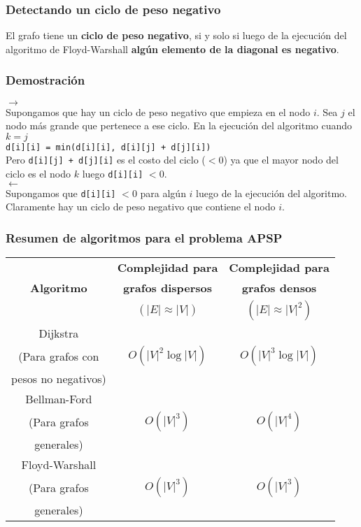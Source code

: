 \documentclass{beamer}
\begin{document}
	\begin{frame}
		\frametitle{Detectando un ciclo de peso negativo}
		El grafo tiene un \textbf{ciclo de peso negativo}, si y solo si luego de la ejecución del algoritmo de Floyd-Warshall \textbf{algún elemento de la diagonal es negativo}. \\
	\end{frame}
	
	\begin{frame}[fragile]
		\frametitle{Demostración}
		$\rightarrow$ \\
		Supongamos que hay un ciclo de peso negativo que empieza en el nodo $i$. Sea $j$ el nodo más grande que pertenece a ese ciclo. En la ejecución del algoritmo cuando $k = j$ \\
		\verb|d[i][i] = min(d[i][i], d[i][j] + d[j][i])|\\
		Pero \verb|d[i][j] + d[j][i]| es el costo del ciclo ($< 0$) ya que el mayor nodo del ciclo es el nodo $k$ luego \verb|d[i][i]| $< 0$.\\
		\vfill 
		$\leftarrow$ \\
		Supongamos que \verb|d[i][i]| $< 0$ para algún $i$ luego de la ejecución del algoritmo. Claramente hay un ciclo de peso negativo que contiene el nodo $i$.
	\end{frame}
	
	\begin{frame}
		\frametitle{Resumen de algoritmos para el problema APSP}
		\begin{tabular}{|c|c|c|}
			\hline
			                   &  \textbf{Complejidad para}    &  \textbf{Complejidad para} \\
			\textbf{Algoritmo} &  \textbf{grafos dispersos}    &  \textbf{grafos  densos}\\ 
			                   & $(|E| \approx |V|)$           &  $(|E| \approx |V|^2)$ \\
			\hline \hline
			Dijkstra  & &\\
			(Para grafos con & $O(|V|^2 \operatorname{log } |V|)$ &  $O(|V|^3 \operatorname{log } |V|)$\\
			pesos no negativos) & & \\
			\hline
			Bellman-Ford & &\\
			(Para grafos & $O(|V|^3)$ &  $O(|V|^4)$\\
			generales) & & \\
			\hline
			Floyd-Warshall &  & \\
			(Para grafos & $O(|V|^3)$ &  $O(|V|^3)$\\
			generales) & & \\
			\hline
		\end{tabular}
	\end{frame}
\end{document}
